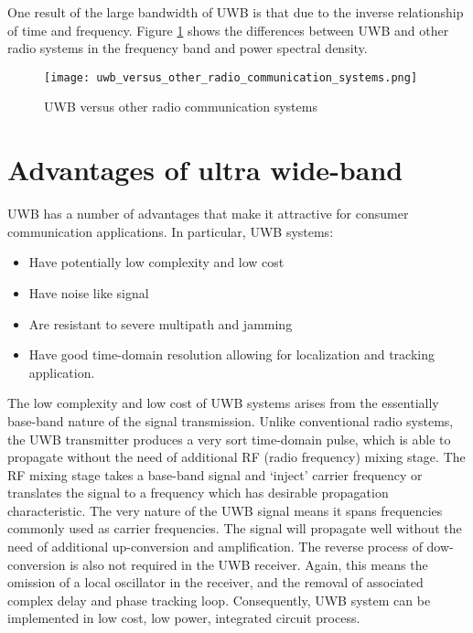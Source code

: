 \documentclass[../../main.tex]{subfiles}
\begin{document}
One result of the large bandwidth of UWB is that due to the inverse relationship of
time and frequency. Figure \ref{fig:uwb_versus_other_radio_communication_systems} shows the differences between UWB and other radio systems in the frequency band and power spectral density.

\begin{figure}[h]
    \centering
    \texttt{[image: uwb\_versus\_other\_radio\_communication\_systems.png]}
    \caption{UWB versus other radio communication systems}
    \label{fig:uwb_versus_other_radio_communication_systems}
\end{figure}

\section{Advantages of ultra wide-band}

UWB has a number of advantages that make it attractive for consumer communication applications. In particular, UWB systems:
\begin{itemize}
    \item Have potentially low complexity and low cost
    \item Have noise like signal
    \item Are resistant to severe multipath and jamming
    \item Have good time-domain resolution allowing for localization and tracking application.
\end{itemize}

The low complexity and low cost of UWB systems arises from the essentially base-band nature of the signal transmission. Unlike conventional radio systems, the UWB transmitter produces a very sort time-domain pulse, which is able to propagate without the need of additional RF (radio frequency) mixing stage. The RF mixing stage takes a base-band signal and `inject' carrier frequency or translates the signal to a frequency which has desirable propagation characteristic. The very nature of the UWB signal means it spans frequencies commonly used as carrier frequencies. The signal will propagate well without the need of additional up-conversion and amplification. The reverse process of dow-conversion is also not required in the UWB receiver. Again, this means the omission of a local oscillator in the receiver, and the removal of associated complex delay and phase tracking loop. Consequently, UWB system can be implemented in low cost, low power, integrated circuit process.
\end{document}
